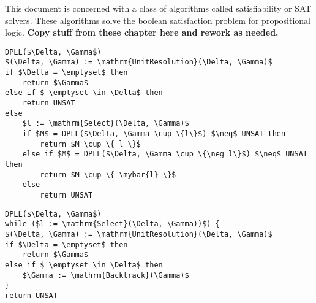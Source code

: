 This document is concerned with a class of algorithms called satisfiability or SAT solvers.
These algorithms solve the boolean satisfaction problem for propositional logic. 
\textbf{Copy stuff from these chapter here and rework as needed.}

\begin{lstlisting}[caption = Example Recursive DPLL Algorithm,mathescape, label = cl:dpllrecalg]
DPLL($\Delta, \Gamma$)
$(\Delta, \Gamma) := \mathrm{UnitResolution}(\Delta, \Gamma)$
if $\Delta = \emptyset$ then
    return $\Gamma$
else if $ \emptyset \in \Delta$ then
    return UNSAT
else
    $l := \mathrm{Select}(\Delta, \Gamma)$
    if $M$ = DPLL($\Delta, \Gamma \cup \{l\}$) $\neq$ UNSAT then
        return $M \cup \{ l \}$ 
    else if $M$ = DPLL($\Delta, \Gamma \cup \{\neg l\}$) $\neq$ UNSAT then 
        return $M \cup \{ \mybar{l} \}$ 
    else
        return UNSAT
\end{lstlisting}

\begin{lstlisting}[caption = Example Iterative DPLL Algorithm,mathescape, label = cl:dplliteralg]
DPLL($\Delta, \Gamma$)
while ($l := \mathrm{Select}(\Delta, \Gamma))$) {
$(\Delta, \Gamma) := \mathrm{UnitResolution}(\Delta, \Gamma)$
if $\Delta = \emptyset$ then
    return $\Gamma$
else if $ \emptyset \in \Delta$ then
    $\Gamma := \mathrm{Backtrack}(\Gamma)$
}
return UNSAT
\end{lstlisting}

